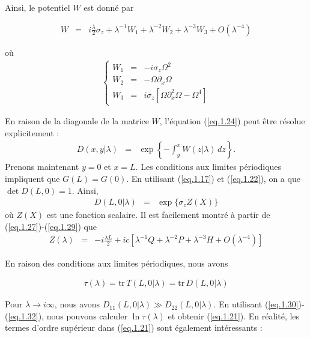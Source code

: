 Ainsi, le potentiel \( W \) est donné par

\begin{eqnarray}
	W & = & i \frac{\lambda}2 \sigma_z + \lambda^{-1} W_1 + \lambda^{-2} W_2 + \lambda^{-3} W_3 + O (\lambda^{-4}) 	
\end{eqnarray}

où
\begin{eqnarray}
	\left \{ \begin{array}{rcl} W_1 & = & -i \sigma_z \Omega^2 \\ W_2 & = & - \Omega \partial_x \Omega \\ W_3 & = & i \sigma_z \left [ \Omega \partial_x^2 \Omega - \Omega^4 \right ] \end{array}\right .
\end{eqnarray}

En raison de la diagonale de la matrice \( W \), l'équation (\ref{eq.1.24}) peut être résolue explicitement :
\begin{eqnarray}
    D(x, y|\lambda) & = & \exp \left\{ - \int_y^x W(z|\lambda) \, dz \right\}.
\end{eqnarray}
Prenons maintenant \( y = 0 \) et \( x = L \). Les conditions aux limites périodiques impliquent que \( G(L) = G(0) \). En utilisant (\ref{eq.1.17}) et (\ref{eq.1.22}), on a que \( \det D(L, 0) = 1 \). Ainsi,
\begin{eqnarray}
    D(L, 0|\lambda) &  =  & \exp \{ \sigma_z Z(X) \}
\end{eqnarray}
où \( Z(X) \) est une fonction scalaire. Il est facilement montré à partir de (\ref{eq.1.27})-(\ref{eq.1.29}) que
\begin{eqnarray}
	Z(\lambda) & = & - i \frac{\lambda L}{2} + i c \left [ \lambda^{-1} Q + \lambda^{-2} P + \lambda^{-3} H + O \left ( \lambda^{-4}  \right )  \right ] 	
\end{eqnarray}


En raison des conditions aux limites périodiques, nous avons

\begin{eqnarray}
	\tau ( \lambda ) = 	\text{tr} \, T(L, 0|\lambda) = \text{tr} \, D(L, 0|\lambda)
\end{eqnarray}


Pour \( \lambda \to i\infty \), nous avons \( D_{11}(L, 0|\lambda) \gg D_{22}(L, 0|\lambda) \). En utilisant (\ref{eq.1.30})-(\ref{eq.1.32}), nous pouvons calculer \( \ln \tau ( \lambda ) \) et obtenir (\ref{eq.1.21}). En réalité, les termes d'ordre supérieur dans (\ref{eq.1.21}) sont également intéressants :

